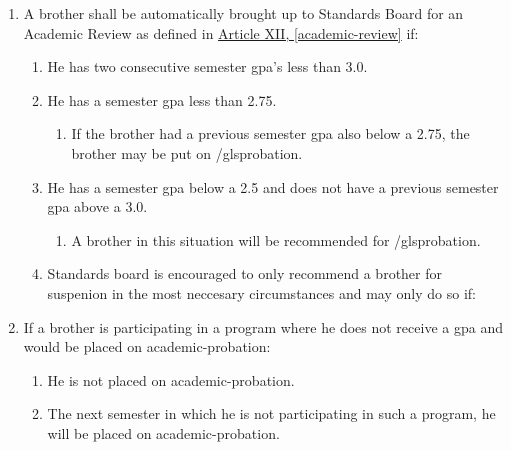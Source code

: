\begin{enumerate}
\begin{enumerate}
\begin{enumerate}
				\item A brother shall be automatically brought up to Standards Board for an Academic Review as defined in \hyperref[academic-review]{Article XII, \autoref*{academic-review}} if:
				\begin{enumerate}
					\item He has two consecutive semester \gls{gpa}'s less than 3.0.
					\item He has a semester \gls{gpa} less than 2.75.
					\begin{enumerate}
						\item If the brother had a previous semester \gls{gpa} also below a 2.75, the brother may be put on /gls{probation}.
					\end{enumerate}
					\item He has a semester \gls{gpa} below a 2.5 and does not have a previous semester \gls{gpa} above a 3.0.
					\begin{enumerate}
						\item A brother in this situation will be recommended for /gls{probation}.
					\end{enumerate}
					\item Standards board is encouraged to only recommend a brother for suspenion in the most neccesary circumstances and may only do so if: 
			\end{enumerate}

		\item If a brother is participating in a program where he does not receive a \gls{gpa} and would be placed on \gls{academic-probation}:
			\begin{enumerate}
				\item He is not placed on \gls{academic-probation}.
				\item The next semester in which he is not participating in such a program, he will be placed on \gls{academic-probation}.
			\end{enumerate}

		\end{enumerate}
	\end{enumerate}



\end{enumerate}
